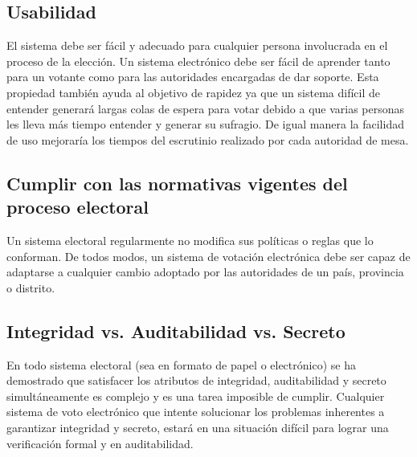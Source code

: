\subsection{Usabilidad}

El sistema debe ser fácil y adecuado para cualquier persona involucrada en el proceso de la elección. Un sistema electrónico debe ser fácil de aprender tanto para un votante como para las autoridades encargadas de dar soporte. Esta propiedad también ayuda al objetivo de rapidez ya que un sistema difícil de entender generará largas colas de espera para votar debido a que varias personas les lleva más tiempo entender y generar su sufragio. De igual manera la facilidad de uso mejoraría los tiempos del escrutinio realizado por cada autoridad de mesa.

\subsection{Cumplir con las normativas vigentes del proceso electoral}
Un sistema electoral regularmente no modifica sus políticas o reglas que lo conforman. De todos modos, un sistema de votación electrónica debe ser capaz de adaptarse a cualquier cambio adoptado por las autoridades de un país, provincia o distrito.

\subsection{Integridad vs. Auditabilidad vs. Secreto}
En todo sistema electoral (sea en formato de papel o electrónico) se ha demostrado que satisfacer los atributos de integridad, auditabilidad y secreto simultáneamente es complejo y es una tarea imposible de cumplir. Cualquier sistema de voto electrónico que intente solucionar los problemas inherentes a garantizar integridad y secreto, estará en una situación difícil para lograr una verificación formal y en auditabilidad. \cite{conicet}

